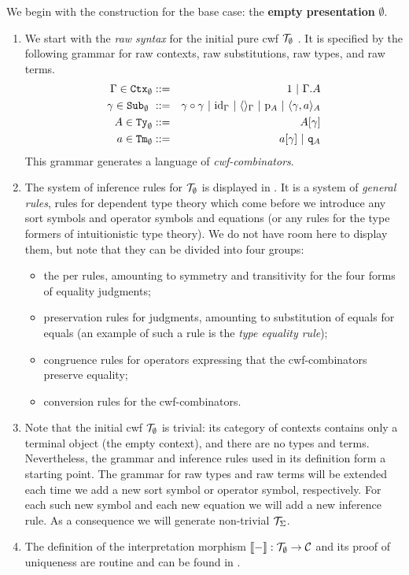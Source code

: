 \documentclass{mscs}
\newcommand{\FYI}[1]{{#1}}
\def\id{\mathrm{id}}
\begin{document}
We begin with the construction for the base case: the {\bf empty \FYI{presentation}} $\emptyset$.
\begin{enumerate}
\item
We start with the {\em raw syntax} for the initial pure cwf ${\mathcal T}_\emptyset$ . It is specified by the following grammar for raw contexts, raw substitutions, raw types, and raw terms.
\begin{eqnarray*}
\Gamma \in \RawCtx_\emptyset &::=& 1  \ |\ \Gamma\cext A\\
\gamma \in \RawSub_\emptyset  \ &::=& \gamma \circ \gamma \ |\ \id_\Gamma \ |\ \langle\rangle_\Gamma \ |\ \p_{A} \ |\ \langle \gamma, a \rangle_A\\
A \in \RawTy_\emptyset  &::=& A[\gamma]\\
a \in \RawTm_\emptyset  &::=& a[\gamma] \ |\ \qI_A
\end{eqnarray*}
This grammar generates a language of {\em cwf-combinators}.
\item
The system of inference rules for ${\mathcal T}_\emptyset$ is displayed in \cite{castellan:tlca2015,castellan:lmcs}. It is a system of {\em general rules}, rules for dependent type theory which come before we introduce any sort symbols and operator symbols and equations (or any rules for the type formers of intuitionistic type theory). We do not have room here to display them, but note that they can be divided into four groups:
\begin{itemize}
\item the per rules, amounting to symmetry and transitivity for the four forms of equality judgments;
\item preservation rules for judgments, amounting to substitution of equals for equals (an example of such a rule is the {\em type equality rule});
\item congruence rules for operators expressing that the cwf-combinators preserve equality;
\item conversion rules for the cwf-combinators.
\end{itemize}
\item
Note that the initial cwf ${\mathcal T}_\emptyset$ is trivial: its category of contexts contains only a terminal object (the empty context), and there are no types and terms. Nevertheless, the grammar and inference rules used in its definition form a starting point. The grammar for raw types and raw terms will be extended each time we add a new sort symbol or operator symbol, respectively. For each such new symbol and each new equation we will add a new inference rule. As a consequence we will generate non-trivial ${\mathcal T}_\Sigma$.
\item
The definition of the interpretation morphism  $\llbracket - \rrbracket : {\mathcal T}_\emptyset \to {\mathcal C}$ and its proof of uniqueness are routine and can be found in \cite{castellan:tlca2015,castellan:lmcs}.
\end{enumerate}
\end{document}
